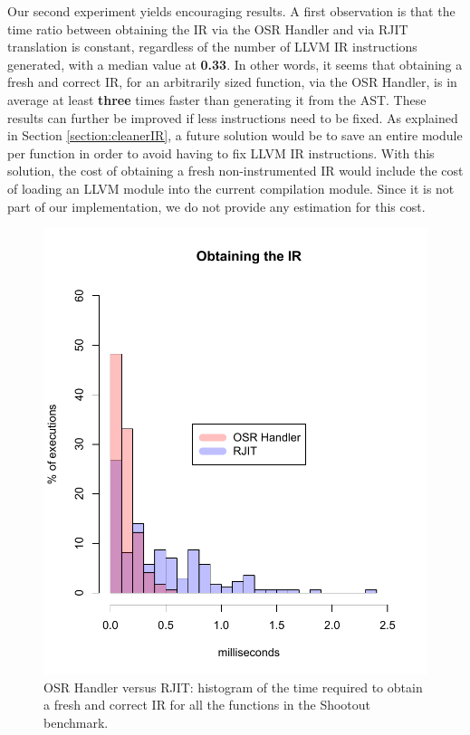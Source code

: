 Our second experiment yields encouraging results.
A first observation is that the time ratio between obtaining the IR via the OSR Handler and via RJIT translation is constant, regardless of the number of LLVM IR instructions generated, with a median value at \textbf{0.33}. 
In other words, it seems that obtaining a fresh and correct IR, for an arbitrarily sized function, via the OSR Handler, is in average at least \textbf{three} times faster than generating it from the AST.
These results can further be improved if less instructions need to be fixed.
As explained in Section \ref{section:cleanerIR}, a future solution would be to save an entire module per function in order to avoid having to fix LLVM IR instructions.
With this solution, the cost of obtaining a fresh non-instrumented IR would include the cost of loading an LLVM module into the current compilation module. 
Since it is not part of our implementation, we do not provide any estimation for this cost.\\

\begin{figure}[h]
    \includegraphics[scale=0.9]{Figures/withoutJitAll2}
    \caption{OSR Handler versus RJIT: histogram of the time required to obtain a fresh and correct IR for all the functions in the Shootout benchmark.}
    \label{fig:withoutJitAll}
\end{figure}


